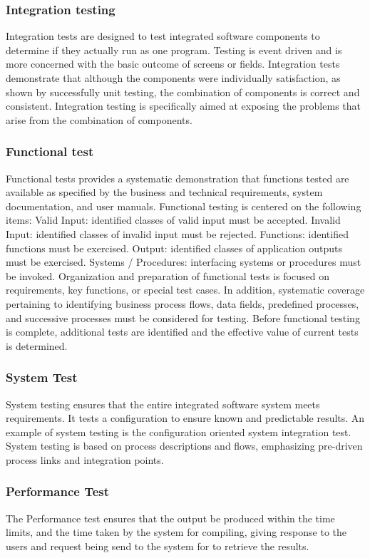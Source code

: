 \documentclass[12pt]{report}
\begin{document}
\subsubsection{Integration testing}
Integration tests are designed to test integrated software components to
determine if they actually run as one program. Testing is event driven and is more
concerned with the basic outcome of screens or fields. Integration tests demonstrate
that although the components were individually satisfaction, as shown by successfully
unit testing, the combination of components is correct and consistent. Integration
testing is specifically aimed at exposing the problems that arise from the combination
of components.
\subsubsection{Functional test}
Functional tests provides a systematic demonstration that functions tested are
available as specified by the business and technical requirements, system
documentation, and user manuals. Functional testing is centered on the following
items:
Valid Input: identified classes of valid input must be accepted.
Invalid Input: identified classes of invalid input must be rejected.
Functions: identified functions must be exercised.
Output: identified classes of application outputs must be exercised.
Systems / Procedures: interfacing systems or procedures must be invoked.
Organization and preparation of functional tests is focused on requirements,
key functions, or special test cases. In addition, systematic coverage pertaining to
identifying business process flows, data fields, predefined processes, and successive
processes must be considered for testing. Before functional testing is complete,
additional tests are identified and the effective value of current tests is determined.
\subsubsection{System Test}
System testing ensures that the entire integrated software system meets
requirements. It tests a configuration to ensure known and predictable results. An
example of system testing is the configuration oriented system integration test.
System testing is based on process descriptions and flows, emphasizing pre-driven
process links and integration points.
\subsubsection{Performance Test}
The Performance test ensures that the output be produced within the time
limits, and the time taken by the system for compiling, giving response to the users
and request being send to the system for to retrieve the results.
\end{document}
